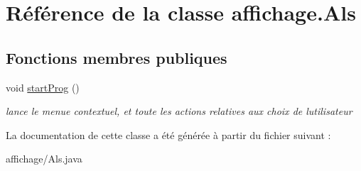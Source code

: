 \hypertarget{classaffichage_1_1_als}{}\section{Référence de la classe affichage.\+Als}
\label{classaffichage_1_1_als}
\subsection*{Fonctions membres publiques}
\begin{DoxyCompactItemize}
\item 
void \hyperlink{classaffichage_1_1_als_a31c2063eab5cb1b14270f2abfc86b998}{start\+Prog} ()\hypertarget{classaffichage_1_1_als_a31c2063eab5cb1b14270f2abfc86b998}{}\label{classaffichage_1_1_als_a31c2063eab5cb1b14270f2abfc86b998}

\begin{DoxyCompactList}\small\item\em lance le menue contextuel, et toute les actions relatives aux choix de l\textquotesingle{}utilisateur \end{DoxyCompactList}\end{DoxyCompactItemize}


La documentation de cette classe a été générée à partir du fichier suivant \+:\begin{DoxyCompactItemize}
\item 
affichage/Als.\+java\end{DoxyCompactItemize}
